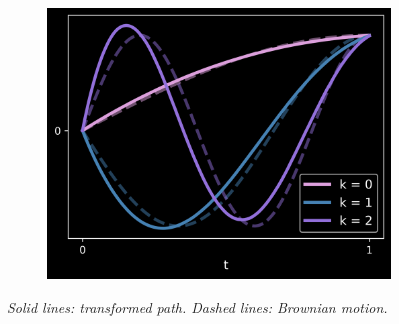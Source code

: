 \begin{figure}[t]
\begin{subfigure}[b]{0.32\textwidth}
    \includegraphics[scale =0.38]{KL/Figures/KLLookback.png}
\end{subfigure}
\vspace{1mm}
\begin{center}
    \footnotesize{
    \textit{Solid lines: transformed
     path.  Dashed lines: Brownian motion.}}
\end{center}
\vspace{-3mm}
\end{figure}
